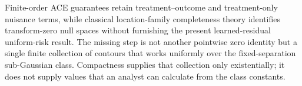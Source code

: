Finite-order ACE guarantees retain treatment--outcome and treatment-only nuisance terms, while classical location-family completeness theory identifies transform-zero null spaces without furnishing the present learned-residual uniform-risk result.  The missing step is not another pointwise zero identity but a single finite collection of contours that works uniformly over the fixed-separation sub-Gaussian class.  Compactness supplies that collection only existentially; it does not supply values that an analyst can calculate from the class constants.